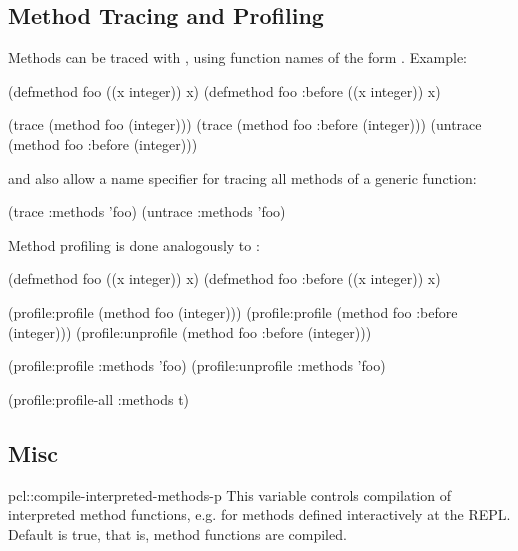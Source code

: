 \subsection{Method Tracing and Profiling}

Methods can be traced with , using function names of the
form .  Example:

\begin{example}
(defmethod foo ((x integer)) x)
(defmethod foo :before ((x integer)) x)

(trace (method foo (integer)))
(trace (method foo :before (integer)))
(untrace (method foo :before (integer)))
\end{example}
  
 and  also allow a name specifier
 for tracing all methods of a generic function:

\begin{example}
(trace :methods 'foo)
(untrace :methods 'foo)
\end{example}

Method profiling is done analogously to :

\begin{example}
(defmethod foo ((x integer)) x)
(defmethod foo :before ((x integer)) x)

(profile:profile (method foo (integer)))
(profile:profile (method foo :before (integer)))
(profile:unprofile (method foo :before (integer)))

(profile:profile :methods 'foo)
(profile:unprofile :methods 'foo)

(profile:profile-all :methods t)
\end{example}



\subsection{Misc}

\begin{defvar}{pcl::}{compile-interpreted-methods-p}
  This variable controls compilation of interpreted method functions,
  e.g. for methods defined interactively at the REPL.  Default is
  true, that is, method functions are compiled.
\end{defvar}


